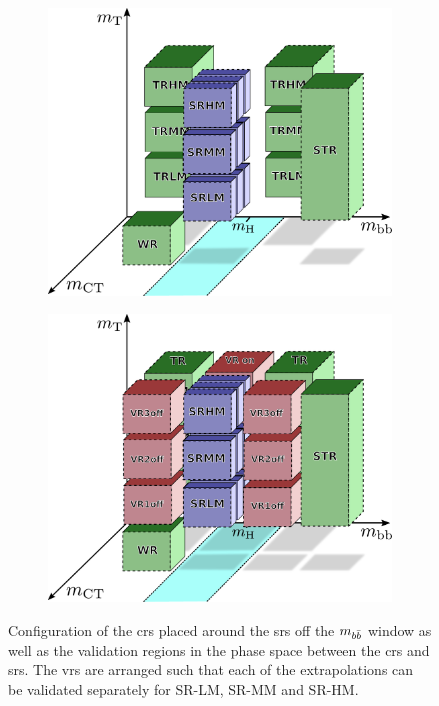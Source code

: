  \begin{figure}[t]
	\centering
	\begin{subfigure}[b]{0.5\linewidth}
		\centering\includegraphics[width=1.0\textwidth]{strategy_5}
		\caption{\label{fig:cr_strategy}}
	\end{subfigure}\hfill
	\begin{subfigure}[b]{0.5\linewidth}
		\centering\includegraphics[width=1.0\textwidth]{strategy_7}
		\caption{\label{fig:vr_strategy}}
	\end{subfigure}\hfill

	\caption{Configuration of  the \glspl{cr} placed around the \glspl{sr} off the $m_{b\bar{b}}$ window as well as  the validation regions in the phase space between the \glspl{cr} and \glspl{sr}. The \glspl{vr} are arranged such that each of the extrapolations can be validated separately for SR-LM, SR-MM and SR-HM.}
	\label{fig:results_HF_scans}
\end{figure}

